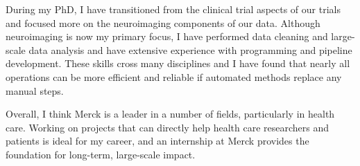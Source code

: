 \documentclass[12pt]{article}
\newcommand{\company}{{Merck }}
\begin{document}
During my PhD, I have transitioned from the clinical trial aspects of our trials and focused more on the neuroimaging components of our data.  Although neuroimaging is now my primary focus, I have performed data cleaning and large-scale data analysis and have extensive experience with programming and pipeline development.  These skills cross many disciplines and I have found that nearly all operations can be more efficient and reliable if automated methods replace any manual steps.

Overall, I think \company is a leader in a number of fields, particularly in health care.  Working on projects that can directly help health care researchers and patients is ideal for my career, and an internship at \company provides the foundation for long-term, large-scale impact.
\end{document}
